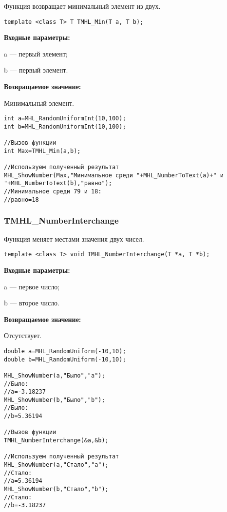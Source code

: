 \documentclass[a4paper,12pt]{article}
\begin{document}
Функция возвращает минимальный элемент из двух.


\begin{lstlisting}[label=code_syntax_TMHL_Min,caption=Синтаксис]
template <class T> T TMHL_Min(T a, T b);
\end{lstlisting}

\textbf{Входные параметры:}

 a --- первый элемент;
	
 b --- первый элемент.

\textbf{Возвращаемое значение:}

Минимальный элемент.


\begin{lstlisting}[label=code_use_TMHL_Min,caption=Пример использования]
int a=MHL_RandomUniformInt(10,100);
int b=MHL_RandomUniformInt(10,100);

//Вызов функции
int Max=TMHL_Min(a,b);

//Используем полученный результат
MHL_ShowNumber(Max,"Минимальное среди "+MHL_NumberToText(a)+" и "+MHL_NumberToText(b),"равно");
//Минимальное среди 79 и 18:
//равно=18
\end{lstlisting}

\subsubsection{TMHL\_NumberInterchange}\label{TMHL_NumberInterchange}

Функция меняет местами значения двух чисел.


\begin{lstlisting}[label=code_syntax_TMHL_NumberInterchange,caption=Синтаксис]
template <class T> void TMHL_NumberInterchange(T *a, T *b);
\end{lstlisting}

\textbf{Входные параметры:}

 a --- первое число;
 
 b --- второе число.

\textbf{Возвращаемое значение:}

 Отсутствует.


\begin{lstlisting}[label=code_use_TMHL_NumberInterchange,caption=Пример использования]
double a=MHL_RandomUniform(-10,10);
double b=MHL_RandomUniform(-10,10);

MHL_ShowNumber(a,"Было","a");
//Было:
//a=-3.18237
MHL_ShowNumber(b,"Было","b");
//Было:
//b=5.36194

//Вызов функции
TMHL_NumberInterchange(&a,&b);

//Используем полученный результат
MHL_ShowNumber(a,"Стало","a");
//Стало:
//a=5.36194
MHL_ShowNumber(b,"Стало","b");
//Стало:
//b=-3.18237
\end{lstlisting}
\end{document}
